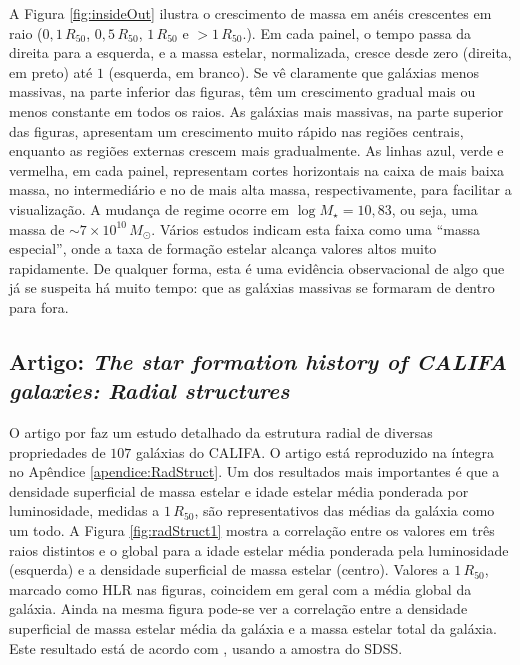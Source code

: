 A Figura \ref{fig:insideOut} ilustra o crescimento de massa em anéis crescentes
em raio ($0,1\,R_{50}$, $0,5\,R_{50}$, $1\,R_{50}$ e $>1\,R_{50}$.). Em cada
painel, o tempo passa da direita para a esquerda, e a massa estelar,
normalizada, cresce desde zero (direita, em preto) até $1$ (esquerda, em
branco). Se vê claramente que galáxias menos massivas, na parte inferior das
figuras, têm um crescimento gradual mais ou menos constante em todos os raios.
As galáxias mais massivas, na parte superior das figuras, apresentam um
crescimento muito rápido nas regiões centrais, enquanto as regiões externas
crescem mais gradualmente. As linhas azul, verde e vermelha, em cada painel,
representam cortes horizontais na caixa de mais baixa massa, no intermediário e
no de mais alta massa, respectivamente, para facilitar a visualização. A mudança
de regime ocorre em $\log M_\star = 10,83$, ou seja, uma massa de $\sim
7\times10^{10}\,M_\odot$. Vários estudos indicam esta faixa como uma ``massa
especial'', onde a taxa de formação estelar alcança valores altos muito
rapidamente. De qualquer forma, esta é uma evidência observacional de algo que
já se suspeita há muito tempo: que as galáxias massivas se formaram de dentro
para fora.



\subsection{Artigo: {\em The star formation history of CALIFA galaxies: Radial
structures}}
\label{sec:pycasso:art:RadStruct}

O artigo por \citet{GonzalezDelgado2014a} faz um estudo detalhado da estrutura
radial de diversas propriedades de $107$ galáxias do CALIFA. O artigo está
reproduzido na íntegra no Apêndice \ref{apendice:RadStruct}.
Um dos resultados mais importantes é que a densidade superficial de massa
estelar e idade estelar média ponderada por luminosidade, medidas a $1\,R_{50}$,
são representativos das médias da galáxia como um todo. A Figura
\ref{fig:radStruct1} mostra a correlação entre os valores em três raios
distintos e o global para a idade estelar média ponderada pela luminosidade
(esquerda) e a densidade superficial de massa estelar (centro). Valores a
$1\,R_{50}$, marcado como HLR nas figuras, coincidem em geral com a média global
da galáxia.
Ainda na mesma figura pode-se ver a correlação entre a densidade superficial de
massa estelar média da galáxia e a massa estelar total da galáxia. Este
resultado está de acordo com \citet{Kauffmann2003}, usando a amostra do SDSS.

